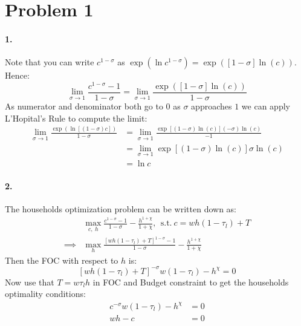 \section*{Problem 1}
\paragraph{1.}
Note that you can write $c^{1 - \sigma}$ as $\exp\left(\ln c^{1 - \sigma}\right) = \exp\left(\left[1 - \sigma\right] \ln \left(c \right) \right)$. Hence:
\begin{equation*}
\lim_{\sigma \to 1} \frac{c^{1 - \sigma} - 1}{1 - \sigma} = \lim_{\sigma \to 1} \frac{\exp\left(\left[1 - \sigma\right] \ln \left(c \right) \right)}{1 - \sigma}
\end{equation*}
As numerator and denominator both go to $0$ as $\sigma $ approaches $1$ we can apply L'Hopital's Rule to compute the limit:
\begin{align*}
\lim_{\sigma \to 1} \frac{\exp\left(\ln\left[\left(1 - \sigma\right) c\right]\right)}{1 - \sigma} &= \lim_{\sigma \to 1} \frac{\exp\left[\left(1 - \sigma\right) \ln \left(c \right) \right] \left(-\sigma\right) \ln\left(c\right)}{-1} \\
 &= \lim_{\sigma \to 1} \exp\left[\left(1 - \sigma\right) \ln\left(c\right)\right] \sigma \ln \left(c\right) \\
 &= \ln c
\end{align*}

\paragraph{2.}
The households optimization problem can be written down as:
\begin{align*}
&\max_{c,~h} \frac{c^{1 - \sigma} - 1}{1 - \sigma} - \frac{h^{1 + \chi}}{1 + \chi}, ~~\text{s.t.}~c = w h \left(1 - \tau_l\right) + T \\
\implies &\max_h \frac{\left[w h \left(1 - \tau_l\right) + T\right]^{1 - \sigma} - 1}{1 - \sigma} - \frac{h^{1 + \chi}}{1 + \chi}
\end{align*}
Then the FOC with respect to $h$ is:
\begin{equation*}
\left[w h \left(1 - \tau_l\right) + T\right]^{-\sigma} w \left(1 - \tau_l\right) - h^\chi = 0
\end{equation*}
Now use that $T = w \tau_l h$ in FOC and Budget constraint to get the households optimality conditions:
\begin{align}
c^{-\sigma} w \left(1 - \tau_l\right) - h^\chi &= 0 \\
w h - c &= 0
\end{align}

